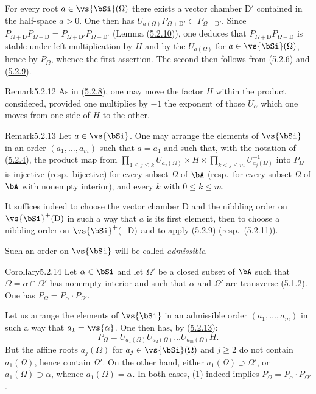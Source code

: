 \documentclass[12pt,a4paper,oneside,english]{smfart}
\makeatletter
\newcommand{\btanchor}[1]{\leavevmode\Hy@raisedlink{\hypertarget{bt:#1}{}}}
\newcommand{\btpageanchor}[1]{\Hy@raisedlink{\hypertarget{p:#1}{}}}
\newcommand{\btref}[1]{\hyperlink{bt:#1}{#1}}
\newcommand{\btpage}[1]{\marginnote{p.~#1}\btpageanchor{#1}}
\newcommand{\pg}[1]{\btpage{#1}}
\theoremstyle{definition}
\theoremstyle{bt}
\makeatother
\begin{document}
For every root $a\in\vs{\bSi}(\Omega)$ there exists a vector chamber
$\mathrm{D}'$ contained in the half-space $a>0$. One then has
$U_{a(\Omega)}P_{\Omega+\mathrm{D}'}\subset P_{\Omega+\mathrm{D}'}$. Since
$P_{\Omega+\mathrm{D}}P_{\Omega-\mathrm{D}}
=P_{\Omega+\mathrm{D}'}P_{\Omega-\mathrm{D}'}$ (Lemma (\btref{5.2.10})), one deduces
that $P_{\Omega+\mathrm{D}}P_{\Omega-\mathrm{D}}$ is stable under left
multiplication by $H$ and by the $U_{a(\Omega)}$ for $a\in\vs{\bSi}(\Omega)$,
hence by $P_{\Omega}$, whence the first assertion. The second then follows from
(\btref{5.2.6}) and (\btref{5.2.9}).

\begin{btstat}{Remark}{5.2.12}\btanchor{5.2.12}
\upshape
As in (\btref{5.2.8}), one may move the factor $H$ within the product considered,
provided one multiplies by $-1$ the exponent of those $U_{\alpha}$ which one
moves from one side of $H$ to the other.
\end{btstat}

\begin{btstat}{Remark}{5.2.13}\btanchor{5.2.13}
Let $a\in\vs{\bSi}$. One may arrange the elements of $\vs{\bSi}$ in an order
$(a_{1},\dots,a_{m})$ such that $a=a_{1}$ and such that, with the notation of
\textup{(\btref{5.2.4})}, the product map from
$\prod_{1\leqslant j\leqslant k}U_{a_{j}(\Omega)}\times H\times
\prod_{k<j\leqslant m}U^{-1}_{a_{j}(\Omega)}$ into $P_{\Omega}$ is injective
(resp.\ bijective) for every subset $\Omega$ of $\bA$ (resp.\ for every subset
$\Omega$ of $\bA$ with nonempty interior), and every $k$ with
$0\leqslant k\leqslant m$.
\end{btstat}
It suffices indeed to choose the vector chamber $\mathrm{D}$ and the nibbling
order on $\vs{\bSi}^{+}(\mathrm{D})$ in such a way that $a$ is its first
element, then to choose a nibbling order on $\vs{\bSi}^{+}(-\mathrm{D})$ and to
apply (\btref{5.2.9}) (resp.\ (\btref{5.2.11})).

Such an order on $\vs{\bSi}$ will be called \emph{admissible}.

\begin{btstat}{Corollary}{5.2.14}\btanchor{5.2.14}
Let $\alpha\in\bSi$ and let $\Omega'$ be a closed subset of $\bA$ such that
$\Omega=\alpha\cap\Omega'$ has nonempty interior and such that $\alpha$ and
$\Omega'$ are transverse \textup{(\btref{5.1.2})}. One has
$P_{\Omega}=P_{\alpha}\cdot P_{\Omega'}$.
\end{btstat}

\pg{101}
Let us arrange the elements of $\vs{\bSi}$ in an admissible order
$(a_{1},\dots,a_{m})$ in such a way that $a_{1}=\vs{\alpha}$. One then has, by
(\btref{5.2.13}):
\begin{equation*}
P_{\Omega}=U_{a_{1}(\Omega)}U_{a_{2}(\Omega)}\dots U_{a_{m}(\Omega)}H.\tag{1}
\end{equation*}
But the affine roots $a_{j}(\Omega)$ for $a_{j}\in\vs{\bSi}(\Omega)$ and
$j\geqslant2$ do not contain $a_{1}(\Omega)$, hence contain $\Omega'$. On the
other hand, either $a_{1}(\Omega)\supset\Omega'$, or $a_{1}(\Omega)\supset\alpha$,
whence $a_{1}(\Omega)=\alpha$. In both cases, (1) indeed implies
$P_{\Omega}=P_{\alpha}\cdot P_{\Omega'}$.
\end{document}
